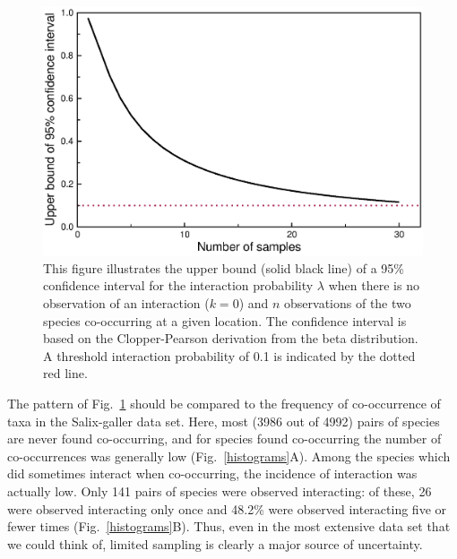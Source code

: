 ﻿\documentclass[12pt]{article}
\begin{document}
  \begin{figure}
    \caption{This figure illustrates the upper bound (solid black line) of a 95\% confidence interval for the interaction probability $\lambda$ when there is no observation of an interaction ($k = 0$) and $n$ observations of the two species co-occurring at a given location. The confidence interval is based on the Clopper-Pearson derivation from the beta distribution. A threshold interaction probability of 0.1 is indicated by the dotted red line.}
    \label{upper_limits}
    \includegraphics*[width=.8\textwidth]{figures/upper_limit_DG.eps}
  \end{figure}


  The pattern of Fig.~\ref{upper_limits} should be compared to the frequency of co-occurrence of taxa in the Salix-galler data set. Here, most (3986 out of 4992) pairs of species are never found co-occurring, and for species found co-occurring the number of co-occurrences was generally low (Fig.~\ref{histograms}A). Among the species which did sometimes interact when co-occurring, the incidence of interaction was actually low. Only 141 pairs of species were observed interacting: of these, 26 were observed interacting only once and 48.2\% were observed interacting five or fewer times (Fig.~\ref{histograms}B). Thus, even in the most extensive data set that we could think of, limited sampling is clearly a major source of uncertainty.
\end{document}
